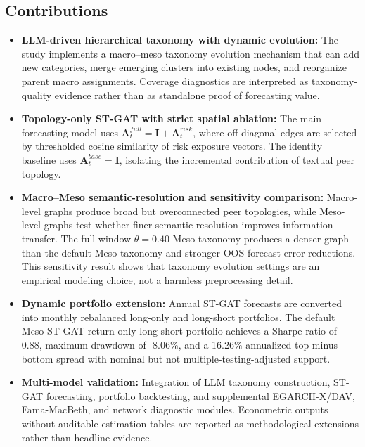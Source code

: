 \documentclass[11pt, a4paper]{article}
\begin{document}
\subsection{Contributions}
\begin{itemize}
    \item \textbf{LLM-driven hierarchical taxonomy with dynamic evolution:} The study implements a macro--meso taxonomy evolution mechanism that can add new categories, merge emerging clusters into existing nodes, and reorganize parent macro assignments. Coverage diagnostics are interpreted as taxonomy-quality evidence rather than as standalone proof of forecasting value.
    \item \textbf{Topology-only ST-GAT with strict spatial ablation:} The main forecasting model uses $\mathbf{A}^{full}_{t}=\mathbf{I}+\mathbf{A}^{risk}_{t}$, where off-diagonal edges are selected by thresholded cosine similarity of risk exposure vectors. The identity baseline uses $\mathbf{A}^{base}_{t}=\mathbf{I}$, isolating the incremental contribution of textual peer topology.
    \item \textbf{Macro--Meso semantic-resolution and sensitivity comparison:} Macro-level graphs produce broad but overconnected peer topologies, while Meso-level graphs test whether finer semantic resolution improves information transfer. The full-window $\theta=0.40$ Meso taxonomy produces a denser graph than the default Meso taxonomy and stronger OOS forecast-error reductions. This sensitivity result shows that taxonomy evolution settings are an empirical modeling choice, not a harmless preprocessing detail.
    \item \textbf{Dynamic portfolio extension:} Annual ST-GAT forecasts are converted into monthly rebalanced long-only and long-short portfolios. The default Meso ST-GAT return-only long-short portfolio achieves a Sharpe ratio of 0.88, maximum drawdown of -8.06\%, and a 16.26\% annualized top-minus-bottom spread with nominal but not multiple-testing-adjusted support.
    \item \textbf{Multi-model validation:} Integration of LLM taxonomy construction, ST-GAT forecasting, portfolio backtesting, and supplemental EGARCH-X/DAV, Fama-MacBeth, and network diagnostic modules. Econometric outputs without auditable estimation tables are reported as methodological extensions rather than headline evidence.
\end{itemize}
\end{document}
